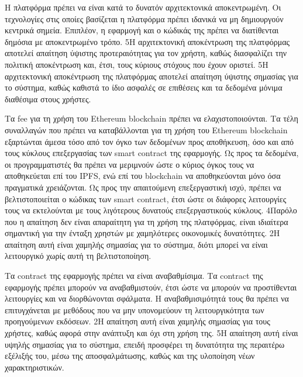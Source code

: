 \newpage
\begin{enumerate}[label=\textbf{<ΜΛΑ-\arabic*>}, leftmargin=\parindent, align=left, labelwidth=\parindent, labelsep=0pt]
	\sysReqItem
		{\label{srs:non-functional-srs-maximum-decentraliztion}}
		{Η πλατφόρμα πρέπει να είναι κατά το δυνατόν αρχιτεκτονικά αποκεντρωμένη.}
		{Οι τεχνολογίες στις οποίες βασίζεται η πλατφόρμα πρέπει ιδανικά να μη δημιουργούν κεντρικά σημεία. Επιπλέον, η εφαρμογή και ο κώδικάς της πρέπει να διατίθενται δημόσια με αποκεντρωμένο τρόπο.}
		{5}{Η αρχιτεκτονική αποκέντρωση της πλατφόρμας αποτελεί απαίτηση ύψιστης προτεραιότητας για τον χρήστη, καθώς διασφαλίζει την πολιτική αποκέντρωση και, έτσι, τους κύριους στόχους που έχουν οριστεί.}
		{5}{Η αρχιτεκτονική αποκέντρωση της πλατφόρμας αποτελεί απαίτηση ύψιστης σημασίας για το σύστημα, καθώς καθιστά το ίδιο ασφαλές σε επιθέσεις και τα δεδομένα μόνιμα διαθέσιμα στους χρήστες.}

	\sysReqItem
		{\label{srs:non-functional-srs-minimize-fees}}
		{Τα fee για τη χρήση του Ethereum blockchain πρέπει να ελαχιστοποιούνται.}
		{Τα τέλη συναλλαγών που πρέπει να καταβάλλονται για τη χρήση του Ethereum blockchain εξαρτώνται άμεσα τόσο από τον όγκο των δεδομένων προς αποθήκευση, όσο και από τους κύκλους επεξεργασίας των smart contract της εφαρμογής. Ως προς τα δεδομένα, οι προγραμματιστές θα πρέπει να μεριμνούν ώστε ο κύριος όγκος τους να αποθηκεύεται επί του IPFS, ενώ επί του blockchain να αποθηκεύονται μόνο όσα πραγματικά χρειάζονται. Ως προς την απαιτούμενη επεξεργαστική ισχύ, πρέπει να βελτιστοποιείται ο κώδικας των smart contract, έτσι ώστε οι διάφορες λειτουργίες τους να εκτελούνται με τους λιγότερους δυνατούς επεξεργαστικούς κύκλους.}
		{4}{Παρόλο που η απαίτηση δεν είναι απαραίτητη για τη χρήση της πλατφόρμας, είναι ιδιαίτερα σημαντική για την ένταξη χρηστών με χαμηλότερες οικονομικές δυνατότητες.}
		{2}{Η απαίτηση αυτή είναι χαμηλής σημασίας για το σύστημα, διότι μπορεί να είναι λειτουργικό χωρίς αυτή τη βελτιστοποίηση.}

	\sysReqItem
		{\label{srs:non-functional-srs-upgrade-contracts}}
		{Τα contract της εφαρμογής πρέπει να είναι αναβαθμίσιμα.}
		{Τα contract της εφαρμογής πρέπει μπορούν να αναβαθμιστούν, έτσι ώστε να μπορούν να προστίθενται λειτουργίες και να διορθώνονται σφάλματα. Η αναβαθμισιμότητά τους θα πρέπει να επιτυγχάνεται με μεθόδους που να μην υπονομεύουν τη λειτουργικότητα των  προηγούμενων εκδόσεων.}
		{2}{Η απαίτηση αυτή είναι χαμηλής σημασίας για τους χρήστες, καθώς αφορά στην ανάπτυξη και όχι στη χρήση της.}
		{5}{Η απαίτηση αυτή είναι υψηλής σημασίας για το σύστημα, επειδή προσφέρει τη δυνατότητα της περαιτέρω εξέλιξής του, μέσω της αποσφαλμάτωσης, καθώς και της υλοποίηση νέων χαρακτηριστικών.}
\end{enumerate}
